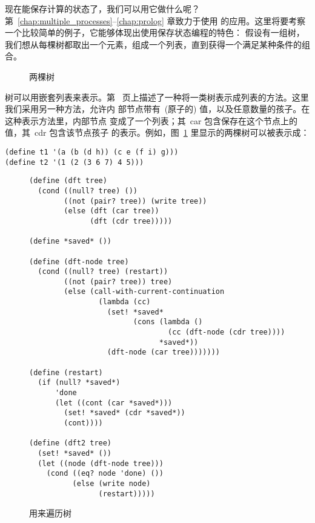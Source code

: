 现在能保存计算的状态了，我们可以用它做什么呢？
第~\ref{chap:multiple_processes}--\ref{chap:prolog} 章致力于使用
\continuation{}的应用。这里将要考察一个比较简单的例子，它能够体现出使用保存状态编程的特色：
假设有一组树，我们想从每棵树都取出一个元素，组成一个列表，直到获得一个满足某种条件的组合。

\begin{figure}
\centering
  \hspace{0.1\textwidth}
  \caption{两棵树}
  \label{fig:two_trees}
\end{figure}

树可以用嵌套列表来表示。第~\pageref{sec:function:recursion_on_subtrees}
页上描述了一种将一类树表示成列表的方法。这里我们采用另一种方法，允许内
部节点带有~(原子的) 值，以及任意数量的孩子。在这种表示方法里，内部节点
变成了一个列表；其~car 包含保存在这个节点上的值，其~cdr 包含该节点孩子
的表示。例如，图~\ref{fig:two_trees} 里显示的两棵树可以被表示成：
\begin{lstlisting}
(define t1 '(a (b (d h)) (c e (f i) g)))
(define t2 '(1 (2 (3 6 7) 4 5)))
\end{lstlisting}

\begin{figure}
\begin{lstlisting}
(define (dft tree)
  (cond ((null? tree) ())
        ((not (pair? tree)) (write tree))
        (else (dft (car tree))
              (dft (cdr tree)))))

(define *saved* ())

(define (dft-node tree)
  (cond ((null? tree) (restart))
        ((not (pair? tree)) tree)
        (else (call-with-current-continuation
                (lambda (cc)
                  (set! *saved*
                        (cons (lambda ()
                                (cc (dft-node (cdr tree))))
                              *saved*))
                  (dft-node (car tree)))))))

(define (restart)
  (if (null? *saved*)
      'done
      (let ((cont (car *saved*)))
        (set! *saved* (cdr *saved*))
        (cont))))

(define (dft2 tree)
  (set! *saved* ())
  (let ((node (dft-node tree)))
    (cond ((eq? node 'done) ())
          (else (write node)
                (restart)))))
\end{lstlisting}
  \caption{用\continuation{}来遍历树}
  \label{fig:tree_traversal_using_continuations}
\end{figure}

